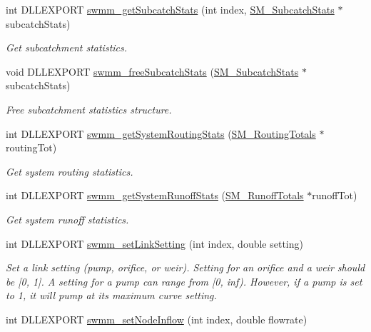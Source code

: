\begin{DoxyCompactItemize}
int D\+L\+L\+E\+X\+P\+O\+RT \hyperlink{group__tkfuncs_ga07cf0c633357b86bfcd0886fed0ae2fb}{swmm\+\_\+get\+Subcatch\+Stats} (int index, \hyperlink{struct_s_m___subcatch_stats}{S\+M\+\_\+\+Subcatch\+Stats} $\ast$subcatch\+Stats)
\begin{DoxyCompactList}\small\item\em Get subcatchment statistics. \end{DoxyCompactList}\item 
void D\+L\+L\+E\+X\+P\+O\+RT \hyperlink{group__tkfuncs_gaf24dfaf8bcd92298782f2449aa18a2f5}{swmm\+\_\+free\+Subcatch\+Stats} (\hyperlink{struct_s_m___subcatch_stats}{S\+M\+\_\+\+Subcatch\+Stats} $\ast$subcatch\+Stats)
\begin{DoxyCompactList}\small\item\em Free subcatchment statistics structure. \end{DoxyCompactList}\item 
int D\+L\+L\+E\+X\+P\+O\+RT \hyperlink{group__tkfuncs_ga8e4dcd4d9243ac428633e7cdabf0712a}{swmm\+\_\+get\+System\+Routing\+Stats} (\hyperlink{struct_s_m___routing_totals}{S\+M\+\_\+\+Routing\+Totals} $\ast$routing\+Tot)
\begin{DoxyCompactList}\small\item\em Get system routing statistics. \end{DoxyCompactList}\item 
int D\+L\+L\+E\+X\+P\+O\+RT \hyperlink{group__tkfuncs_gabf3ea290e2af763289e18db435ea2ccd}{swmm\+\_\+get\+System\+Runoff\+Stats} (\hyperlink{struct_s_m___runoff_totals}{S\+M\+\_\+\+Runoff\+Totals} $\ast$runoff\+Tot)
\begin{DoxyCompactList}\small\item\em Get system runoff statistics. \end{DoxyCompactList}\item 
int D\+L\+L\+E\+X\+P\+O\+RT \hyperlink{group__tkfuncs_gab44d2b1c21a6f750b0ce4c48ba16be81}{swmm\+\_\+set\+Link\+Setting} (int index, double setting)
\begin{DoxyCompactList}\small\item\em Set a link setting (pump, orifice, or weir). Setting for an orifice and a weir should be \mbox{[}0, 1\mbox{]}. A setting for a pump can range from \mbox{[}0, inf). However, if a pump is set to 1, it will pump at its maximum curve setting. \end{DoxyCompactList}\item 
int D\+L\+L\+E\+X\+P\+O\+RT \hyperlink{group__tkfuncs_ga6438a8a45d7712b8b02ba630cd8e1db3}{swmm\+\_\+set\+Node\+Inflow} (int index, double flowrate)

\end{DoxyCompactItemize}
